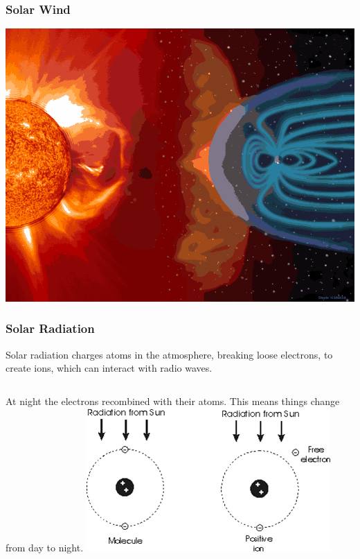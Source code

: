 \documentclass[10pt]{beamer}
\begin{document}
\begin{frame}
\frametitle{Solar Wind}
\begin{center}
\includegraphics[width=\textwidth]{magfield.png}
\end{center}
\end{frame}

\begin{frame}
\frametitle{Solar Radiation}
Solar radiation charges atoms in the atmosphere, breaking loose electrons, to create ions, which can interact with radio waves.\\
\begin{columns}
At night the electrons recombined with their atoms. This means things change from day to night.
\includegraphics[width=\textwidth]{ions.png}
\end{columns}
\end{frame}
\end{document}
